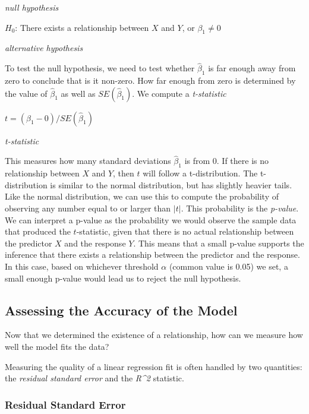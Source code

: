 \documentclass[]{book}
\begin{document}
\emph{null hypothesis}

\(H_0\): There exists a relationship between \(X\) and \(Y\), or \(\beta_1 \neq 0\)

\emph{alternative hypothesis}

To test the null hypothesis, we need to test whether \(\hat\beta_1\) is far enough away from zero to conclude that is it non-zero. How far enough from zero is determined by the value of \(\hat\beta_1\) as well as \(SE(\hat\beta_1)\). We compute a \emph{t-statistic}

\(t = (\beta_1 - 0)/SE(\hat\beta_1)\)

\emph{t-statistic}

This measures how many standard deviations \(\hat\beta_1\) is from 0. If there is no relationship between \(X\) and \(Y\), then \(t\) will follow a t-distribution. The t-distribution is similar to the normal distribution, but has slightly heavier tails. Like the normal distribution, we can use this to compute the probability of observing any number equal to or larger than \(|t|\). This probability is the \emph{p-value}. We can interpret a p-value as the probability we would observe the sample data that produced the \(t\)-statistic, given that there is no actual relationship between the predictor \(X\) and the response \(Y\). This means that a small p-value supports the inference that there exists a relationship between the predictor and the response. In this case, based on whichever threshold \(\alpha\) (common value is 0.05) we set, a small enough p-value would lead us to reject the null hypothesis.

\hypertarget{assessing-the-accuracy-of-the-model}{%
\subsection{Assessing the Accuracy of the Model}\label{assessing-the-accuracy-of-the-model}}

Now that we determined the existence of a relationship, how can we measure how well the model fits the data?

Measuring the quality of a linear regression fit is often handled by two quantities: the \emph{residual standard error} and the \emph{R\^{}2} statistic.

\hypertarget{residual-standard-error}{%
\subsubsection{Residual Standard Error}\label{residual-standard-error}}
\end{document}
